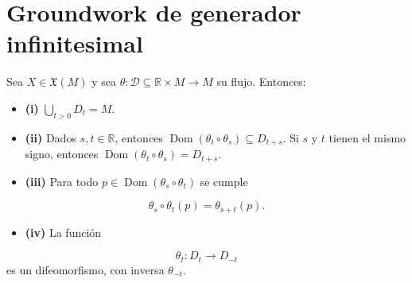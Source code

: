 \section{Groundwork de generador infinitesimal}
\begin{booktheorem}{}
Sea $X\in\mathfrak X(M)$ y sea $\theta:\mathcal D\subseteq\mathbb R\times M\to M$ su flujo. Entonces:

\begin{itemize}
\item \textbf{(i)} $\bigcup_{t>0}D_t=M$.
\item \textbf{(ii)} Dados $s,t\in\mathbb R$, entonces $\operatorname{Dom}(\theta_t\circ\theta_s)\subseteq D_{t+s}$. Si $s$ y $t$ tienen el mismo signo, entonces $\operatorname{Dom}(\theta_t\circ\theta_s)=D_{t+s}$.
\item \textbf{(iii)} Para todo $p\in\operatorname{Dom}(\theta_s\circ\theta_t)$ se cumple
\end{itemize}
\[
\theta_s\circ\theta_t(p)=\theta_{s+t}(p).
\]
\begin{itemize}
\item \textbf{(iv)} La función
\end{itemize}
\[
\theta_t:D_t\to D_{-t}
\]
es un difeomorfismo, con inversa $\theta_{-t}$.

\end{booktheorem}
